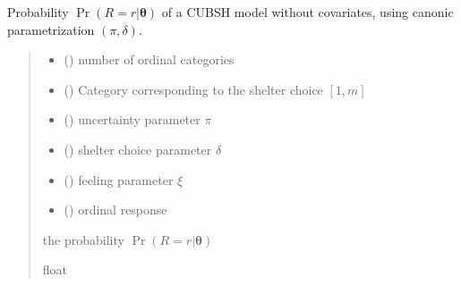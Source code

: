 \documentclass[letterpaper,10pt,english]{sphinxmanual}
\begin{document}

\begin{fulllineitems}
\label{\detokenize{cubmods:cubmods.cubsh.proba_delta}}
\pysigstartsignatures
{}
\pysigstopsignatures
\sphinxAtStartPar
Probability \(\Pr(R = r | \pmb\theta)\) of a CUBSH model without covariates,
using canonic parametrization \((\pi, \delta)\).
\begin{quote}\begin{description}
\begin{itemize}
\item {} 
\sphinxAtStartPar
{} () \textendash{} number of ordinal categories

\item {} 
\sphinxAtStartPar
{} () \textendash{} Category corresponding to the shelter choice \([1,m]\)

\item {} 
\sphinxAtStartPar
{} () \textendash{} uncertainty parameter \(\pi\)

\item {} 
\sphinxAtStartPar
{} () \textendash{} shelter choice parameter \(\delta\)

\item {} 
\sphinxAtStartPar
{} () \textendash{} feeling parameter \(\xi\)

\item {} 
\sphinxAtStartPar
{} () \textendash{} ordinal response

\end{itemize}

\sphinxAtStartPar
the probability \(\Pr(R = r | \pmb\theta)\)

\sphinxAtStartPar
float

\end{description}\end{quote}

\end{fulllineitems}
\end{document}

